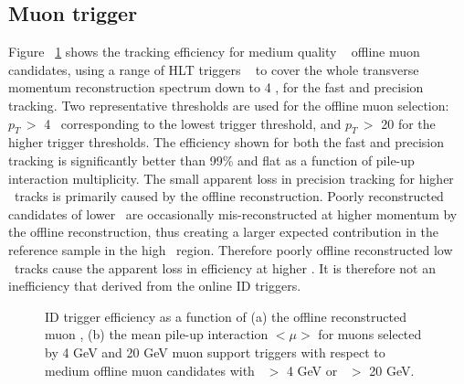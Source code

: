 		\subsection*{Muon trigger}
		Figure ~\ref{fig:muon_idtrig_perf} shows the tracking efficiency for medium quality ~\cite{cite-key} offline muon candidates, using a range of HLT triggers ~\cite{ATLAS-CONF-2012-099} to cover the whole transverse momentum reconstruction spectrum down to 4 \gev, for the fast and precision tracking.  
		Two representative thresholds are used for the offline muon selection: $p_T\,>$ 4 \gev\ corresponding to the lowest trigger threshold, and $p_T\,>$ 20 \gev for the higher trigger thresholds. 
		The efficiency shown for both the fast and precision tracking is significantly better than 99\% and flat as a function of pile-up interaction multiplicity. The small apparent loss in precision tracking for higher \pt\ tracks is primarily caused by the offline reconstruction. Poorly reconstructed candidates of lower \pt\ are occasionally mis-reconstructed at higher momentum by the offline reconstruction, thus creating a larger expected contribution in the reference sample in the high \pt\ region. Therefore poorly offline reconstructed low \pt\ tracks cause the apparent loss in efficiency at higher \pt. It is therefore not an inefficiency that derived from the online \ac{ID} triggers.
		\begin{figure}[!htb]
	\begin{center}
		\hspace{0.05\textwidth}
		\hspace{0.05\textwidth}
	\end{center}	
	\caption{\ac{ID} trigger efficiency as a function of (a) the offline reconstructed muon \pt, (b) the mean pile-up interaction $<\mu>$ for muons selected by 4 GeV and 20 GeV muon support triggers with respect to medium offline muon candidates with \pt\ $>$ 4 GeV or \pt\ $>$ 20 GeV.}
	\label{fig:muon_idtrig_perf}
	\end{figure}	 
	
